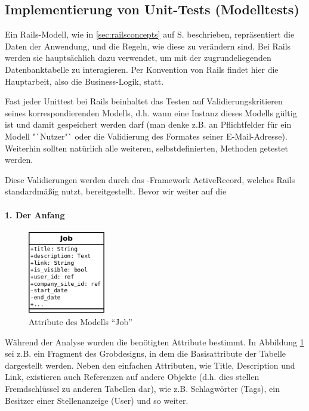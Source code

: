 \subsection{Implementierung von Unit-Tests (Modelltests)}    
\label{sec:awunit}

Ein Rails-Modell, wie in \ref{sec:railsconcepts} auf S. \pageref{sec:railsconcepts} beschrieben, repräsentiert die Daten der Anwendung, und die Regeln, wie diese zu verändern sind. Bei Rails werden sie hauptsächlich dazu verwendet, um mit der zugrundeliegenden Datenbanktabelle zu interagieren. Per Konvention von Rails findet hier die Hauptarbeit, also die Business-Logik, statt.

Fast jeder Unittest bei Rails beinhaltet das Testen auf Validierungskritieren seines korrespondierenden Modells, d.h. wann eine Instanz dieses Modells gültig ist und damit gespeichert werden darf (man denke z.B. an Pflichtfelder für ein Modell "`Nutzer"` oder die Validierung des Formates seiner E-Mail-Adresse). Weiterhin sollten natürlich alle weiteren, selbstdefinierten, Methoden getestet werden.

Diese Validierungen werden durch das -Framework ActiveRecord, welches Rails standardmäßig nutzt, bereitgestellt. Bevor wir weiter auf die 

\paragraph{1. Der Anfang}
\begin{figure}[htbp]
 \centering

 \includegraphics[width=0.3\textwidth]{./diagrams/job-erm.png}
 \caption{Attribute des Modells "`Job"'}
  \label{fig:job-erm}
\end{figure}

Während der Analyse wurden die benötigten Attribute bestimmt. In Abbildung \ref{fig:job-erm} sei z.B. ein Fragment des Grobdesigns, in dem die Basisattribute der Tabelle dargestellt werden. Neben den einfachen Attributen, wie Title, Description und Link, existieren auch Referenzen auf andere Objekte (d.h. dies stellen Fremdschlüssel zu anderen Tabellen dar), wie z.B. Schlagwörter (Tags), ein Besitzer einer Stellenanzeige (User) und so weiter.

